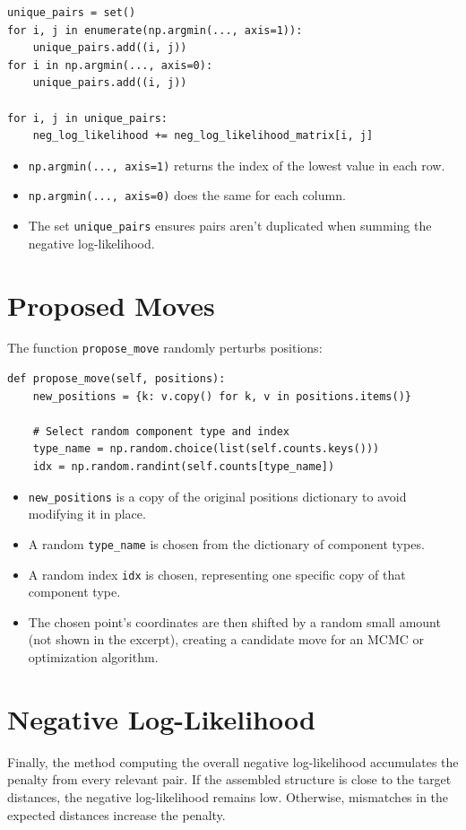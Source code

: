 \documentclass[12pt]{article}
\begin{document}
\begin{lstlisting}
unique_pairs = set()
for i, j in enumerate(np.argmin(..., axis=1)):
    unique_pairs.add((i, j))
for i in np.argmin(..., axis=0):
    unique_pairs.add((i, j))

for i, j in unique_pairs:
    neg_log_likelihood += neg_log_likelihood_matrix[i, j]
\end{lstlisting}

\begin{itemize}
    \item \texttt{np.argmin(..., axis=1)} returns the index of the lowest value in each row.
    \item \texttt{np.argmin(..., axis=0)} does the same for each column.
    \item The set \texttt{unique\_pairs} ensures pairs aren’t duplicated when summing the negative log-likelihood.
\end{itemize}

\section{Proposed Moves}
The function \texttt{propose\_move} randomly perturbs positions:

\begin{lstlisting}
def propose_move(self, positions):
    new_positions = {k: v.copy() for k, v in positions.items()}

    # Select random component type and index
    type_name = np.random.choice(list(self.counts.keys()))
    idx = np.random.randint(self.counts[type_name])
\end{lstlisting}

\begin{itemize}
  \item \texttt{new\_positions} is a copy of the original positions dictionary to avoid modifying it in place.
  \item A random \texttt{type\_name} is chosen from the dictionary of component types.
  \item A random index \texttt{idx} is chosen, representing one specific copy of that component type.
  \item The chosen point's coordinates are then shifted by a random small amount (not shown in the excerpt), creating a candidate move for an MCMC or optimization algorithm.
\end{itemize}

\section{Negative Log-Likelihood}
Finally, the method computing the overall negative log-likelihood accumulates the penalty from every relevant pair. If the assembled structure is close to the target distances, the negative log-likelihood remains low. Otherwise, mismatches in the expected distances increase the penalty.
\end{document}
